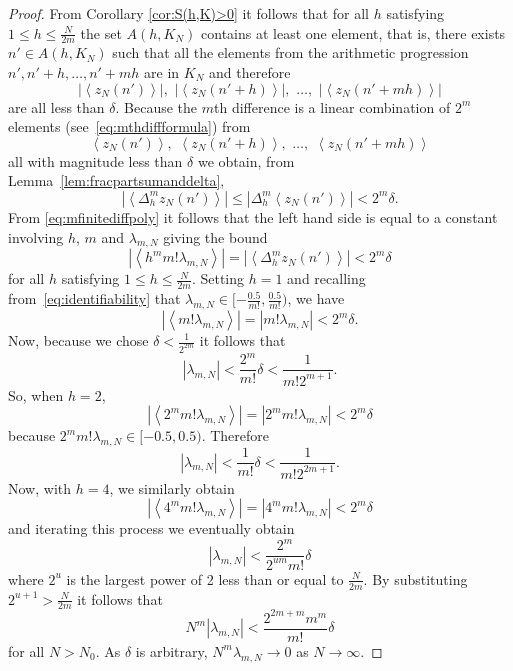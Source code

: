 \documentclass[aap,preprint]{imsart}
\newcommand{\fracpart}[1]{\left\langle #1 \right\rangle}
\newcommand{\sabs}[1]{\vert #1 \vert}
\begin{document}
\begin{proof}
From Corollary \ref{cor:S(h,K)>0} it follows that for all $h$ satisfying $1\leq h \leq\frac{N}{2m}$ the set $A(h,K_N)$ contains at least one element, that is, there exists $n' \in A(h,K_N)$ such that all the elements from the arithmetic progression $n', n'+h, \dots, n' + mh$ are in $K_N$ and therefore 
\[
\sabs{\fracpart{z_N(n')}},\,\, \sabs{\fracpart{z_N(n'+h)}}, \,\, \dots, \,\, \sabs{\fracpart{z_N(n'+mh)}} 
\] 
are all less than $\delta$.  Because the $m$th difference is a linear combination of $2^{m}$ elements (see~\eqref{eq:mthdiffformula}) from 
\[
\fracpart{z_N(n')}, \,\, \fracpart{z_N(n'+h)}, \,\, \dots, \,\, \fracpart{z_N(n'+mh)}
\]
all with magnitude less than $\delta$ we obtain, from Lemma~\ref{lem:fracpartsumanddelta},
\begin{equation}\label{eq:Deltazfracbound}
|\fracpart{\Delta_h^m z_N(n')}| \leq |\Delta_h^m \fracpart{ z_N(n')}| < 2^{m}\delta.
\end{equation}
From \eqref{eq:mfinitediffpoly} it follows that the left hand side is equal to a constant involving $h$, $m$ and $\lambda_{m,N}$ giving the bound
\begin{equation}\label{eq:startiterativearg}
|\fracpart{ h^m m! \lambda_{m,N} }|  = |\fracpart{   \Delta_h^m z_N(n') }| < 2^m\delta
\end{equation}
for all $h$ satisfying $1\leq h \leq\frac{N}{2m}$. Setting $h = 1$ and recalling from~\eqref{eq:identifiability} that $\lambda_{m,N} \in [-\tfrac{0.5}{m!}, \tfrac{0.5}{m!})$, we have
 \[
 |\fracpart{ m! \lambda_{m,N} }| = | m! \lambda_{m,N} |< 2^m\delta.
 \]
Now, because we chose $\delta < \tfrac{1}{2^{2m}}$ it follows that 
\[
| \lambda_{m,N} |< \frac{2^m}{m!}\delta < \frac{1}{m! 2^{m+1}}.
\]
So, when $h = 2$, 
\[
|\fracpart{ 2^m m! \lambda_{m,N} }| = | 2^m m! \lambda_{m,N} |< 2^m\delta
\]
because $2^m m! \lambda_{m,N} \in [-0.5, 0.5)$. Therefore
\[
| \lambda_{m,N} |< \frac{1}{m!}\delta < \frac{1}{m! 2^{2m+1}}.
\]
Now, with $h = 4$, we similarly obtain 
\[
|\fracpart{ 4^m m! \lambda_{m,N} }| = | 4^m m! \lambda_{m,N} |< 2^m\delta
\]
and iterating this process we eventually obtain 
\[
| \lambda_{m,N} | < \frac{2^m}{2^{um} m!}\delta
\]
where $2^u$ is the largest power of 2 less than or equal to $\tfrac{N}{2m}$.  %
By substituting $2^{u+1} > \frac{N}{2m}$ it follows that
 \begin{equation}\label{eq:enditerativearg}
 N^m|\lambda_{m,N}| < \frac{2^{2m+m}m^m}{m!}\delta
 \end{equation}
for all $N > N_0$.  As $\delta$ is arbitrary, $N^m \lambda_{m,N} \rightarrow 0$ as $N\rightarrow \infty$.


\end{proof}
\end{document}
